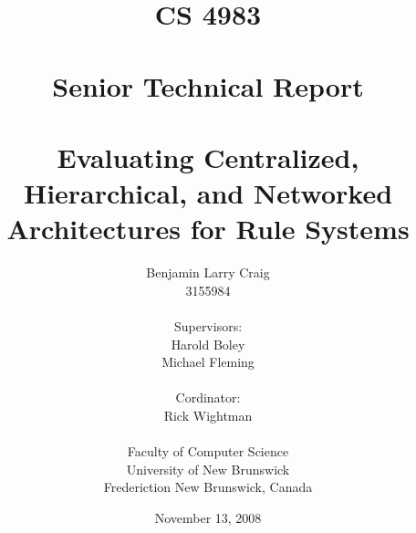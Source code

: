 \documentclass[12pt]{report}
\date{}
\begin{document}
\title{\textbf{CS 4983}\\~\\ \textbf{Senior Technical Report} \\~\\ Evaluating Centralized, Hierarchical, and Networked
Architectures for Rule Systems}\author{Benjamin Larry Craig \\ 3155984\\~\\ Supervisors: \\ Harold Boley \\ Michael Fleming\\~\\ Cordinator: \\ Rick Wightman \\~\\Faculty of Computer Science\\
	 University of New Brunswick\\
	 Frederiction New Brunswick, Canada \\
	 }
\date{November 13, 2008}
\end{document}
